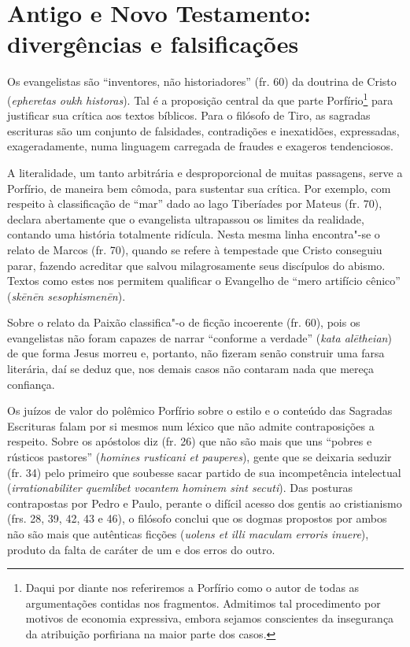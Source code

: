 \section{Antigo e Novo Testamento: divergências e falsificações}

Os evangelistas são “inventores, não historiadores” (fr. 60) da
doutrina de Cristo (\textit{epheretas oukh historas}).
Tal é a
proposição central da que parte Porfírio\footnote{ Daqui por diante nos
referiremos a Porfírio como o autor de todas as argumentações contidas
nos fragmentos. Admitimos tal procedimento por motivos de economia
expressiva, embora sejamos conscientes da insegurança da atribuição
porfiriana na maior parte dos casos.} para justificar sua crítica aos
textos bíblicos. Para o filósofo de Tiro, as sagradas escrituras são um
conjunto de falsidades, contradições e inexatidões, expressadas,
exageradamente, numa linguagem carregada de fraudes e exageros
tendenciosos. 

A literalidade, um tanto arbitrária e desproporcional de muitas
passagens, serve a Porfírio, de maneira bem cômoda, para sustentar sua
crítica. Por exemplo, com respeito à classificação de “mar” dado ao
lago Tiberíades por Mateus (fr. 70), declara abertamente que o
evangelista ultrapassou os limites da realidade, contando uma história
totalmente ridícula.
Nesta mesma
linha encontra"-se o relato de Marcos (fr. 70), quando se refere à
tempestade que Cristo conseguiu parar, fazendo acreditar que salvou
milagrosamente seus discípulos do abismo. Textos como estes nos
permitem qualificar o Evangelho de “mero artifício cênico” (\textit{skēnēn
sesophismenēn}).

Sobre o relato da Paixão classifica"-o de ficção incoerente (fr. 60),
pois os evangelistas não foram capazes de narrar “conforme a verdade”
(\textit{kata alētheian})
de que forma Jesus morreu e, portanto, não fizeram senão construir uma
farsa literária, daí se deduz que, nos demais casos não contaram nada que mereça
confiança. 


Os juízos de valor do polêmico Porfírio sobre o estilo e o conteúdo das
Sagradas Escrituras falam por si mesmos num léxico que não admite
contraposições a respeito. Sobre os apóstolos diz (fr. 26) que não são
mais que uns “pobres e rústicos pastores” (\textit{homines rusticani et
pauperes}), gente que se deixaria seduzir (fr. 34) pelo primeiro que
soubesse sacar partido de sua incompetência intelectual
(\textit{irrationabiliter quemlibet vocantem hominem sint secuti}). Das
posturas contrapostas por Pedro e Paulo, perante o difícil acesso dos
gentis ao cristianismo (frs. 28, 39, 42, 43 e 46), o filósofo conclui
que os dogmas propostos por ambos não são mais que autênticas ficções
(\textit{uolens et illi maculam erroris inuere}), produto da
falta de caráter de um e dos erros do outro. 

